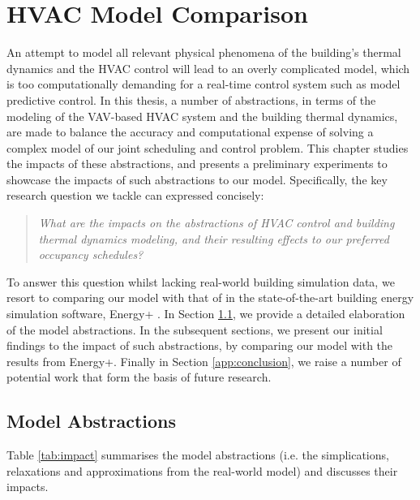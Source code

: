 \appendix
\chapter{HVAC Model Comparison}
\label{cha:ep}

An attempt to model all relevant physical phenomena of the building's thermal dynamics and the HVAC control will lead to an overly complicated model, which is too computationally demanding for a real-time control system such as model predictive control. In this thesis, a number of abstractions, in terms of the modeling of the VAV-based HVAC system and the building thermal dynamics, are made to balance the accuracy and computational expense of solving a complex model of our joint scheduling and control problem. This chapter studies the impacts of these abstractions, and presents a preliminary experiments to showcase the impacts of such abstractions to our model. Specifically, the key research question we tackle can expressed concisely:
\begin{quotation}
		\emph{What are the impacts on the abstractions of HVAC control and building thermal dynamics modeling, and their resulting effects to our preferred occupancy schedules?}
\end{quotation}
To answer this question whilst lacking real-world building simulation data, we resort to comparing our model with that of in the state-of-the-art building energy simulation software, Energy+ \citep{crawley2000energyplus}. In Section \ref{app:model}, we provide a detailed elaboration of the model abstractions. In the subsequent sections, we present our initial findings to the impact of such abstractions, by comparing our model with the results from Energy+. Finally in Section \ref{app:conclusion}, we raise a number of potential work that form the basis of future research.

\section{Model Abstractions}\label{app:model}

Table \ref{tab:impact} summarises the model abstractions (i.e. the simplications, relaxations and approximations from the real-world model) and discusses their impacts.

